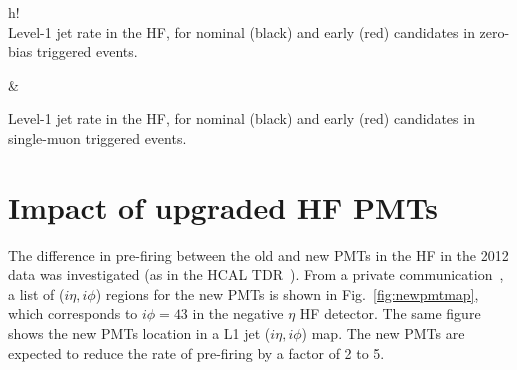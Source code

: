 \documentclass[11pt]{cmspaperpdf}
\begin{document}
\begin{2figures}{h!}
 \\
\caption{Level-1 jet rate in the HF, for nominal (black) and early (red) candidates in zero-bias triggered events.}\label{fig:fwdrate_minb} &
\caption{Level-1 jet rate in the HF, for nominal (black) and early (red) candidates in single-muon triggered events.}\label{fig:fwdrate_smu}
\end{2figures}

\section{Impact of upgraded HF PMTs}

The difference in pre-firing between the old and new PMTs in the HF in the 2012 data was investigated (as in the HCAL TDR~\cite{hcaltdr}). From a private communication~\cite{privcomm}, a list of ($i\eta, i\phi$) regions for the new PMTs is shown in Fig.~\ref{fig:newpmtmap}, which corresponds to $i \phi=43$ in the negative $\eta$ HF detector. The same figure shows the new PMTs location in a L1 jet ($i\eta, i\phi$) map. The new PMTs are expected to reduce the rate of pre-firing by a factor of 2 to 5.
\end{document}
